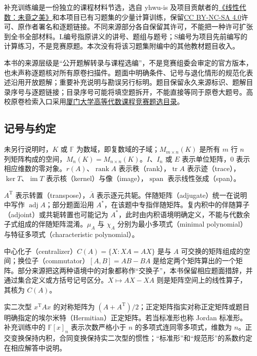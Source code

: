 \documentclass[UTF8,12pt,a4paper,fontset=fandol]{ctexart}
\begin{document}
补充训练编是一份独立的课程材料节选，选自 yhwu-is 及项目贡献者的\href{https://github.com/yhwu-is/Linear-Algebra-Left-Undone}{《线性代数：未竟之美》}和本项目已有习题集的少量计算训练，保留\href{https://creativecommons.org/licenses/by-nc-sa/4.0/}{CC BY-NC-SA 4.0}许可、原作者署名和逐题链接。不同来源部分各自保留其许可，不能把一种许可扩张到全书全部材料。L编号指原讲义的讲号、题组与题号；S编号为项目先前编写的计算练习，不是竞赛原题。本次没有将该习题集附编中的其他教材题目收入。

本书的来源层级是“公开题解转录与课程选编”，不是竞赛组委会审定的官方版本，也未声称逐题核对所有原卷扫描件。题面中明确条件、记号与退化情形的规范化表述沿用开放题解；重要补充说明与勘误另行标明。题目保留永久来源标识、题解目录序号与逐题链接；目录序号可能将填空题拆开，不能直接等同于原卷大题号。高校原卷检索入口采用\href{https://gdjpkc.xmu.edu.cn/DocumentList.aspx?cID=22&dID=383}{厦门大学高等代数课程竞赛题选目录}。

\subsection*{记号与约定}
未另行说明时，$K$ 或 $\mathbb F$ 为数域，即复数域的子域；$M_{m\times n}(K)$ 是所有 $m$ 行 $n$ 列矩阵构成的空间，$M_n(K)=M_{n\times n}(K)$。$I$、$I_n$ 或 $E$ 表示单位矩阵，$0$ 表示相应维数的零对象。$r(A)$、$\operatorname{rank}A$ 表示秩（rank），$\operatorname{tr}A$ 表示迹（trace），$\ker T$、$\operatorname{im}T$ 表示核（kernel）与像（image），$\operatorname{span}$ 表示线性张成（span）。

$A^{\mathrm T}$ 表示转置（transpose），$\overline A$ 表示逐元共轭。伴随矩阵（adjugate）统一在说明中写作 $\operatorname{adj}A$；部分题面沿用 $A^*$，在该题中专指伴随矩阵。复内积中的伴随算子（adjoint）或共轭转置也可能记为 $A^*$，此时由内积语境明确定义，不能与代数余子式组成的伴随矩阵混淆。$\mu_A$ 与 $\chi_A$ 分别为最小多项式（minimal polynomial）与特征多项式（characteristic polynomial）。

中心化子（centralizer）$C(A)=\{X:XA=AX\}$ 是与 $A$ 可交换的矩阵组成的空间；换位子（commutator）$[A,B]=AB-BA$ 是给定两个矩阵算出的一个矩阵。部分来源把这两种语境中的对象都称作“交换子”，本书保留相应题面措辞，并通过集合定义或方括号记号区分。$X\mapsto AX-XA$ 则是矩阵空间上的线性算子，其核为 $C(A)$。

实二次型 $x^{\mathrm T}Ax$ 的对称矩阵为 $(A+A^{\mathrm T})/2$；正定矩阵指实对称正定矩阵或题目明确指定的埃尔米特（Hermitian）正定矩阵。若当标准形也称 Jordan 标准形。补充训练中的 $\mathbb F[x]_n$ 表示次数严格小于 $n$ 的多项式连同零多项式，维数为 $n$。正交变换保持内积，合同变换保持实二次型的惯性；“标准形”和“规范形”的系数约定在相应解答中说明。
\tableofcontents
\clearpage
\end{document}
